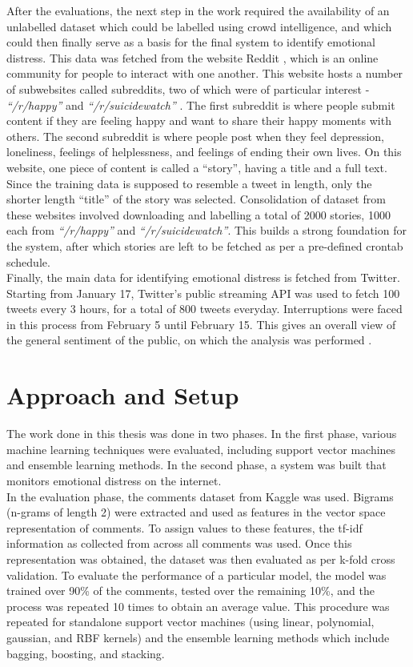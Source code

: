 After the evaluations, the next step in the work required the availability of an unlabelled dataset which could be labelled using crowd intelligence, and which could then finally serve as a basis for the final system to identify emotional distress. This data was fetched from the website Reddit \cite{reddit}, which is an online community for people to interact with one another. This website hosts a number of subwebsites called subreddits, two of which were of particular interest - \emph{``/r/happy''} \cite{reddit_happy} and \emph{``/r/suicidewatch''} \cite{reddit_suicidewatch}. The first subreddit is where people submit content if they are feeling happy and want to share their happy moments with others. The second subreddit is where people post when they feel depression, loneliness, feelings of helplessness, and feelings of ending their own lives. On this website, one piece of content is called a ``story'', having a title and a full text. Since the training data is supposed to resemble a tweet in length, only the shorter length ``title'' of the story was selected. Consolidation of dataset from these websites involved downloading and labelling a total of 2000 stories, 1000 each from \emph{``/r/happy''} and \emph{``/r/suicidewatch''}. This builds a strong foundation for the system, after which stories are left to be fetched as per a pre-defined crontab schedule.\\

Finally, the main data for identifying emotional distress is fetched from Twitter. Starting from January 17, Twitter's public streaming API \cite{twitter_streaming_api} was used to fetch 100 tweets every 3 hours, for a total of 800 tweets everyday. Interruptions were faced in this process from February 5 until February 15. This gives an overall view of the general sentiment of the public, on which the analysis was performed .

\section{Approach and Setup}
The work done in this thesis was done in two phases. In the first phase, various machine learning techniques were evaluated, including support vector machines and ensemble learning methods. In the second phase, a system was built that monitors emotional distress on the internet.\\

In the evaluation phase, the comments dataset from Kaggle \cite{kaggle} was used. Bigrams (n-grams of length 2) were extracted and used as features in the vector space representation of comments. To assign values to these features, the tf-idf information as collected from across all comments was used. Once this representation was obtained, the dataset was then evaluated as per k-fold cross validation. To evaluate the performance of a particular model, the model was trained over 90\% of the comments, tested over the remaining 10\%, and the process was repeated 10 times to obtain an average value. This procedure was repeated for standalone support vector machines (using linear, polynomial, gaussian, and RBF kernels) and the ensemble learning methods which include bagging, boosting, and stacking.\\

